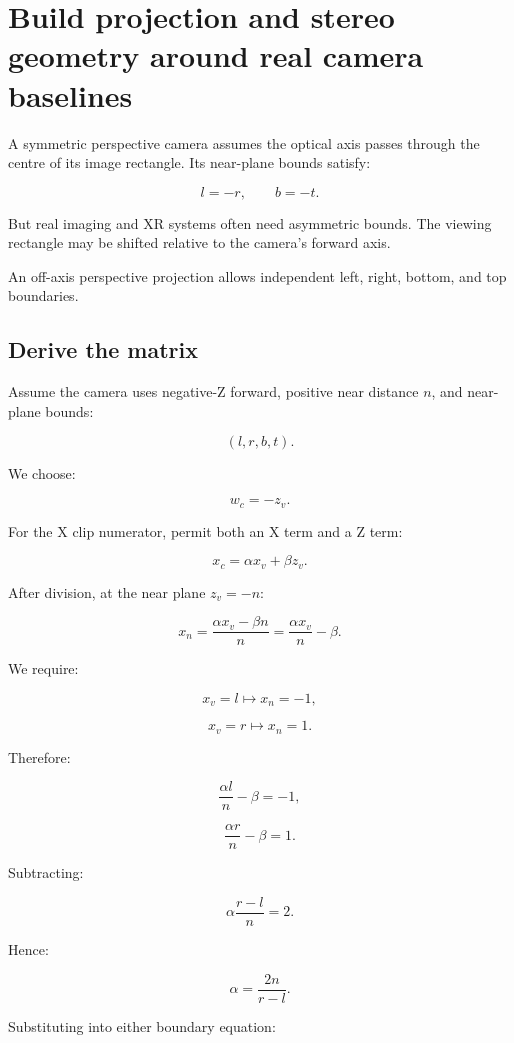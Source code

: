 \section{Build projection and stereo geometry around real camera baselines}\label{02-foundations-ii-ch035-build-projection-and-stereo-geometry-around-real-camera-baselines}

A symmetric perspective camera assumes the optical axis passes through the centre of its image rectangle. Its near-plane bounds satisfy:

\[ l=-r,\qquad b=-t. \]

But real imaging and XR systems often need asymmetric bounds. The viewing rectangle may be shifted relative to the camera's forward axis.

An off-axis perspective projection allows independent left, right, bottom, and top boundaries.

\subsection{Derive the matrix}\label{02-foundations-ii-ch035-derive-the-matrix}

Assume the camera uses negative-Z forward, positive near distance \(n\), and near-plane bounds:

\[ (l,r,b,t). \]

We choose:

\[ w_c=-z_v. \]

For the X clip numerator, permit both an X term and a Z term:

\[ x_c=\alpha x_v+\beta z_v. \]

After division, at the near plane \(z_v=-n\):

\[ x_n=\frac{\alpha x_v-\beta n}{n} =\frac{\alpha x_v}{n}-\beta. \]

We require:

\[ x_v=l\longmapsto x_n=-1, \]

\[ x_v=r\longmapsto x_n=1. \]

Therefore:

\[ \frac{\alpha l}{n}-\beta=-1, \]

\[ \frac{\alpha r}{n}-\beta=1. \]

Subtracting:

\[ \alpha\frac{r-l}{n}=2. \]

Hence:

\[ \boxed{\alpha=\frac{2n}{r-l}}. \]

Substituting into either boundary equation:

